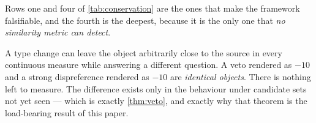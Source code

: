 Rows one and four of \cref{tab:conservation} are the ones that make the framework
falsifiable, and the fourth is the deepest, because it is the only one that
\emph{no similarity metric can detect}.

 A type change can leave the object arbitrarily
close to the source in every continuous measure while answering a different
question. A veto rendered as $-10$ and a strong dispreference rendered as $-10$
are \emph{identical objects}. There is nothing left to measure. The difference
exists only in the behaviour under candidate sets not yet seen --- which is
exactly \cref{thm:veto}, and exactly why that theorem is the load-bearing result
of this paper.

